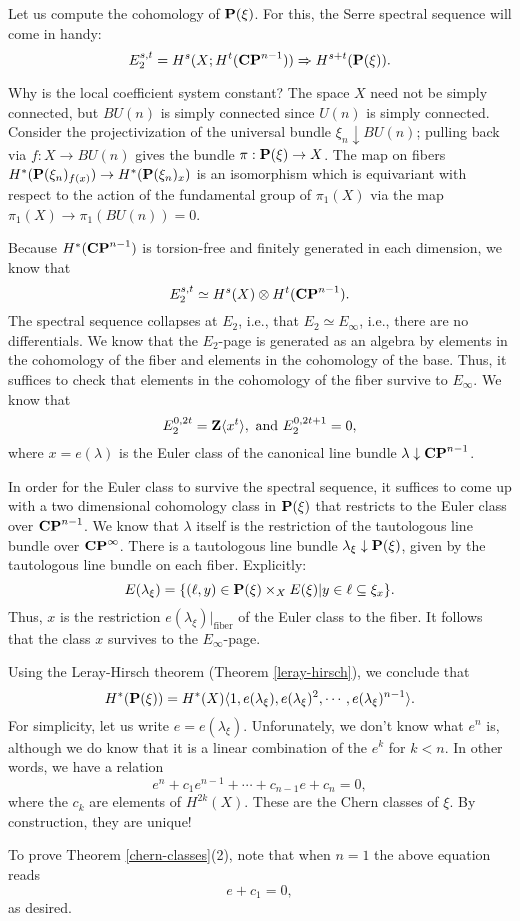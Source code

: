 Let us compute the cohomology of $\mathbf P(\xi)$. For this, the Serre spectral
sequence will come in handy:
$$
E_2^{s,t} = H^s(X; H^t(\mathbf{CP}^{n-1})) \Rightarrow H^{s+t}(\mathbf P(\xi)).
$$
\begin{remark}
    Why is the local coefficient system constant? The space $X$ need not be
    simply connected, but $BU(n)$ is simply connected since $U(n)$ is simply
    connected. Consider the projectivization of the universal bundle
    $\xi_n\downarrow BU(n)$; pulling back via $f:X\to BU(n)$ gives the bundle
    $\pi:\mathbf P(\xi)\to X$. The map on fibers $H^\ast(\mathbf P(\xi_n)_{f(x)}) \to
    H^\ast(\mathbf P(\xi_n)_{x})$ is an isomorphism which is equivariant with respect
    to the action of the fundamental group of $\pi_1(X)$ via the map $\pi_1 (X)
    \to \pi_1(BU(n)) = 0$.
\end{remark}
Because $H^\ast(\mathbf{CP}^{n-1})$ is torsion-free and finitely generated in each
dimension, we know that
$$E_2^{s,t} \simeq H^s(X) \otimes H^t(\mathbf{CP}^{n-1}).$$
The spectral sequence collapses at $E_2$, i.e., that $E_2 \simeq E_\infty$,
i.e., there are no differentials. We know that the $E_2$-page is generated as
an algebra by elements in the cohomology of the fiber and elements in the
cohomology of the base. Thus, it suffices to check that elements in the
cohomology of the fiber survive to $E_\infty$. We know that
$$E_2^{0,2t} = \mathbf Z\langle x^t\rangle,\text{ and }E_2^{0,2t+1} = 0,$$
where $x = e(\lambda)$ is the Euler class of the canonical line bundle
$\lambda\downarrow\mathbf{CP}^{n-1}$.

In order for the Euler class to survive the spectral sequence, it suffices to
come up with a two dimensional cohomology class in $\mathbf P(\xi)$ that restricts to
the Euler class over $\mathbf{CP}^{n-1}$. We know that $\lambda$ itself is the
restriction of the tautologous line bundle over $\mathbf{CP}^\infty$. There is a
tautologous line bundle $\lambda_\xi \downarrow \mathbf P(\xi)$, given by the
tautologous line bundle on each fiber. Explicitly:
$$E(\lambda_\xi)=\{(\ell,y)\in \mathbf P(\xi)\times_X E(\xi) | y\in \ell\subseteq
\xi_x\}.$$
Thus, $x$ is the restriction $e(\lambda_\xi)|_\text{fiber}$ of the Euler class
to the fiber. It follows that the class $x$ survives to the $E_\infty$-page.

Using the Leray-Hirsch theorem (Theorem \ref{leray-hirsch}), we conclude that
$$H^\ast(\mathbf P(\xi)) = H^\ast(X)\langle 1, e(\lambda_\xi), e(\lambda_\xi)^2,
\cdots, e(\lambda_\xi)^{n-1}\rangle.$$
For simplicity, let us write $e = e(\lambda_\xi)$. Unforunately, we don't know
what $e^n$ is, although we do know that it is a linear combination of the $e^k$
for $k<n$. In other words, we have a relation
$$e^n + c_1e^{n-1} + \cdots + c_{n-1} e + c_n = 0,$$
where the $c_k$ are elements of $H^{2k}(X)$. These are the Chern classes of
$\xi$. By construction, they are unique!

To prove Theorem \ref{chern-classes}(2), note that when $n=1$ the above
equation reads
$$e+c_1 = 0,$$
as desired.

